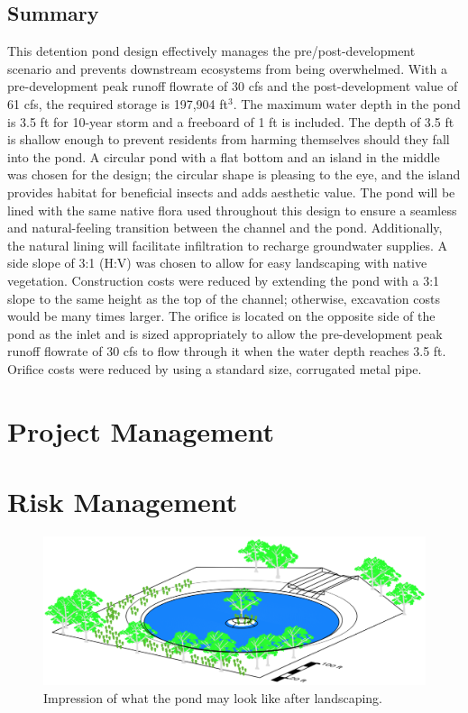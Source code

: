 \documentclass[11pt,letterpaper,final]{report}
\begin{document}
\begin{flushleft}
\begin{table}[H]
\begin{tabular}{lcc}
\end{tabular} 
\end{table}


\section{Summary}
This detention pond design effectively manages the pre/post-development scenario and prevents downstream ecosystems from being overwhelmed. With a pre-development peak runoff flowrate of 30 cfs and the post-development value of 61 cfs, the required storage is 197,904 ft$^3$. The maximum water depth in the pond is 3.5 ft for 10-year storm and a freeboard of 1 ft is included. The depth of 3.5 ft is shallow enough to prevent residents from harming themselves should they fall into the pond. A circular pond with a flat bottom and an island in the middle was chosen for the design; the circular shape is pleasing to the eye, and the island provides habitat for beneficial insects and adds aesthetic value. The pond will be lined with the same native flora used throughout this design to ensure a seamless and natural-feeling transition between the channel and the pond. Additionally, the natural lining will facilitate infiltration to recharge groundwater supplies. A side slope of 3:1 (H:V) was chosen to allow for easy landscaping with native vegetation. Construction costs were reduced by extending the pond with a 3:1 slope to the same height as the top of the channel; otherwise, excavation costs would be many times larger. The orifice is located on the opposite side of the pond as the inlet and is sized appropriately to allow the pre-development peak runoff flowrate of 30 cfs to flow through it when the water depth reaches 3.5 ft. Orifice costs were reduced by using a standard size, corrugated metal pipe.

\setcounter{figure}{0}
\setcounter{section}{0}
\setcounter{table}{0}
\chapter{Project Management}


\setcounter{figure}{0}
\setcounter{section}{0}
\setcounter{table}{0}
\chapter{Risk Management}

\begin{figure}[H]
    \centering
    \includegraphics[height=.2\textheight]{F3P.png}
    \caption{Impression of what the pond may look like after landscaping. }
\end{figure}



\end{flushleft}
\end{document}
